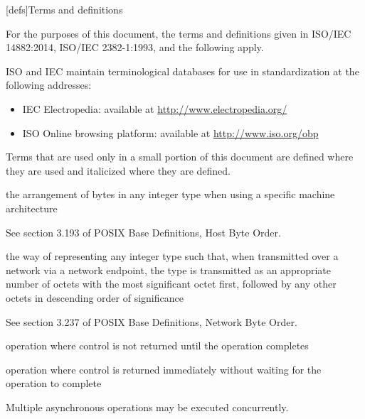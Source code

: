 
[defs]{Terms and definitions}

\pnum
{}%
For the purposes of this document,
the terms and definitions
given in ISO/IEC 14882:2014,
ISO/IEC 2382-1:1993,
and the following apply.

\pnum
ISO and IEC maintain terminological databases
for use in standardization
at the following addresses:
\begin{itemize}
\item IEC Electropedia: available at \url{http://www.electropedia.org/}
\item ISO Online browsing platform: available at \url{http://www.iso.org/obp}
\end{itemize}

\pnum
Terms that are used only in a small portion of this document
are defined where they are used and italicized where they are
defined.

%
the arrangement of bytes in any integer type when using a specific machine architecture

\begin{defnote}
See section 3.193 of POSIX Base Definitions, Host Byte Order.
\end{defnote}

%
the way of representing any integer type such that, when transmitted over a network via a network endpoint,
the  type is transmitted as an appropriate number of octets with the most significant octet first,
followed by any other octets in descending order of significance

\begin{defnote}
See section 3.237 of POSIX Base Definitions, Network Byte Order.
\end{defnote}

%
operation where control is not returned until the operation completes

%
operation where control is returned immediately without waiting for the operation to complete

\begin{defnote}Multiple asynchronous operations may be executed concurrently.\end{defnote}

\setcounter{tocdepth}{1}
